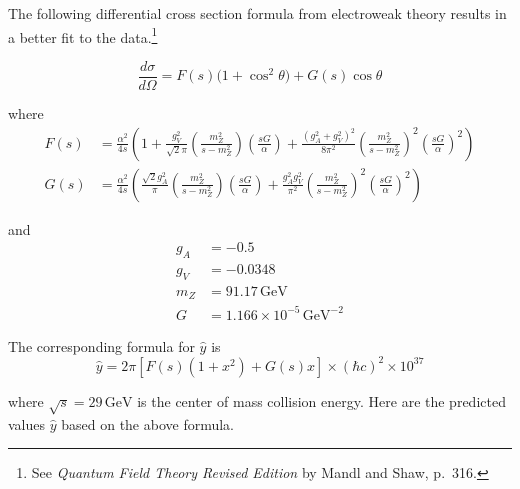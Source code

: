 The following differential cross section formula from electroweak
theory results in a better fit to the
data.\footnote
{See {\it Quantum Field Theory Revised Edition} by Mandl and Shaw, p.~316.}

\begin{equation*}
\frac{d\sigma}{d\Omega}=F(s)\bigl(1+\cos^2\theta\bigr)+G(s)\cos\theta
\end{equation*}

where
\begin{align*}
F(s)&=\frac{\alpha^2}{4s}
\left(
1+\frac{g_V^2}{\sqrt{2}\pi}\left(\frac{m_Z^2}{s-m_Z^2}\right)\left(\frac{sG}{\alpha}\right)
+\frac{(g_A^2+g_V^2)^2}{8\pi^2}\left(\frac{m_Z^2}{s-m_Z^2}\right)^2\left(\frac{sG}{\alpha}\right)^2
\right)
\\
G(s)&=\frac{\alpha^2}{4s}
\left(
\frac{\sqrt{2}g_A^2}{\pi}\left(\frac{m_Z^2}{s-m_Z^2}\right)\left(\frac{sG}{\alpha}\right)
+\frac{g_A^2g_V^2}{\pi^2}\left(\frac{m_Z^2}{s-m_Z^2}\right)^2\left(\frac{sG}{\alpha}\right)^2
\right)
\end{align*}

and
\begin{align*}
g_A&=-0.5
\\
g_V&=-0.0348
\\
m_Z&=91.17\,\text{GeV}
\\
G&=1.166\times10^{-5}\,\text{GeV}^{-2}
\end{align*}

The corresponding formula for $\hat{y}$ is
\begin{equation*}
\hat{y}=2\pi\left[F(s)(1+x^2)+G(s)x\right]\times(\hbar c)^2\times10^{37}
\end{equation*}

where $\sqrt{s}=29\,\text{GeV}$ is the center of mass collision energy.
Here are the predicted values $\hat{y}$ based on the above formula.

